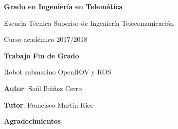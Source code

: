\documentclass[twoside,a4paper,12pt,openany]{book}
\begin{document}
\thispagestyle{empty}

\baselineskip

\vspace{2cm}

\begin{figure}[htb]
  \centerline{}
\end{figure}

\begin{center}
  {\Large {\bf Grado en Ingeniería en Telemática}}
  \vspace{5mm}
 
  {\large {Escuela Técnica Superior de Ingeniería Telecomunicación}}
  \vspace{5mm}

  {\large {Curso académico 2017/2018}}

  \vspace{1cm}

  {\large {\bf Trabajo Fin de Grado}}

  \vspace{2cm}

  {\large {Robot submarino OpenROV y ROS\\[1cm] }}

  \vspace{5cm}
  {\bf Autor}: Saúl Ibáñez Cerro
  
  {\bf Tutor}: Francisco Martín Rico 
\end{center}

\clearpage
\newpage{\pagestyle{empty}\cleardoublepage}
\thispagestyle{empty}

\vspace{5cm}

\clearpage
\newpage{\pagestyle{empty}\cleardoublepage}
\thispagestyle{empty}

\vspace{5cm}
\textbf{\huge{Agradecimientos}}\\
\end{document}
